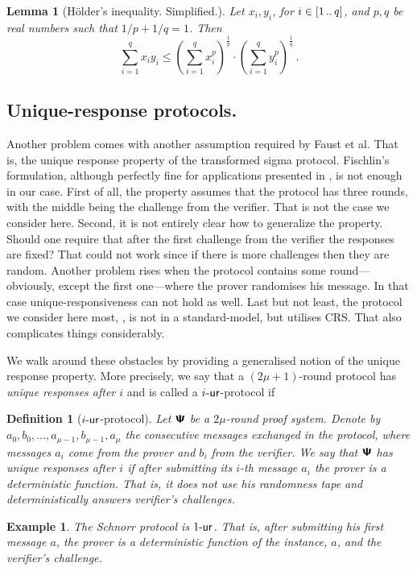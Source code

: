 \let\accentvec\vec \documentclass[runningheads,10pt]{llncs}
\newtheorem{lemma}[theorem]{Lemma}
\newtheorem{definition}[theorem]{Definition}
\newtheorem{example}[theorem]{Example} } \usepackage{soul} \usepackage{soulutf8}
\begin{document}
\begin{lemma}[H\"older's inequality. Simplified.]\label{lem:holder}
	Let $x_i, y_i$, for $i \in [1 \, .. \, q]$, and $p, q$ be real numbers such that $1/p + 1/q = 1$. Then
	\[
		\sum_{i = 1}^{q} x_i y_i \leq \left(\sum_{i = 1}^{q} x_i^p\right)^{\frac{1}{p}} \cdot \left(\sum_{i = 1}^{q} y_i^p\right)^{\frac{1}{q}}\,.
	\]
\end{lemma}

\subsection{Unique-response protocols.}
Another problem comes with another assumption required by Faust et al. That is, the unique response property of the transformed sigma protocol.
Fischlin's formulation, although perfectly fine for applications presented in \cite{C:Fischlin05}, is not enough in our case.
First of all, the property assumes that the protocol has three rounds, with the middle being the challenge from the verifier. That is not the case we consider here. Second, it is not entirely clear how to generalize the property. Should one require that after the first challenge from the verifier the responses are fixed? That could not work since if there is more challenges then they are random.
Another problem rises when the protocol contains some round---obviously, except the first one---where the prover randomises his message. In that case unique-responsiveness can not hold as well.
Last but not least, the protocol we consider here most, \plonk, is not in a standard-model, but utilises CRS. That also complicates things considerably.

We walk around these obstacles by providing a generalised notion of the unique response property.
More precisely, we say that a $(2\mu + 1)$-round protocol has \emph{unique responses after $i$} and is called a ${i\text{-}\mathsf{ur}}$-protocol if
\begin{definition}[${i\text{-}\mathsf{ur}}$-protocol]
	\label{def:wiur}
	Let $\bm{\mathsf{\Psi}}$ be a $2\mu$-round proof system.
	Denote by $a_0, b_0, \ldots, a_{\mu - 1}, b_{\mu - 1}, a_{\mu}$ the consecutive messages exchanged in the protocol, where messages $a_i$ come from the prover and $b_i$ from the verifier.
	We say that $\bm{\mathsf{\Psi}}$ has \emph{unique responses after $i$}
	if after submitting its $i$-th message $a_i$ the prover is a deterministic function. That is, it does not use his randomness tape and deterministically answers verifier's challenges.
\end{definition}
\begin{example}
	The Schnorr protocol is ${1\text{-}\mathsf{ur}}$. That is, after submitting his first message $a$, the prover is a deterministic function of the instance, $a$, and the verifier's challenge.
\end{example}
\end{document}
